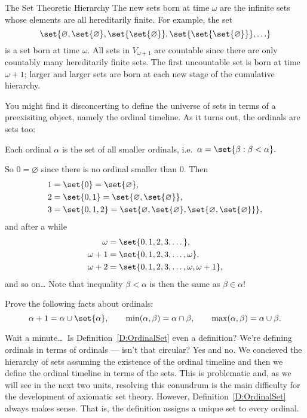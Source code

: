 \begin{unit}{The Set Theoretic Hierarchy}
\noindent
The new sets born at time \(\omega\) are the infinite sets whose elements are all hereditarily finite.
For example, the set \[\set{\varnothing,\set{\varnothing},\set{\set{\varnothing}},\set{\set{\set{\varnothing}}},\ldots}\]
is a set born at time \(\omega.\)
All sets in \(V_{\omega+1}\) are countable since there are only countably many hereditarily finite sets.
The first uncountable set is born at time \(\omega+1\); larger and larger sets are born at each new stage of the cumulative hierarchy.

You might find it disconcerting to define the universe of sets in terms of a preexisiting object, namely the ordinal timeline.
As it turns out, the ordinals are sets too:
 
\begin{definition}\label{D:OrdinalSet}
  Each ordinal \(\alpha\) is the set of all smaller ordinals, i.e.\ \(\alpha = \set{\beta: \beta < \alpha}.\)
\end{definition}
 
\noindent
So \(0 = \varnothing\) since there is no ordinal smaller than \(0.\) 
Then 
\[\begin{aligned}
  1 &= \set{0} = \set{\varnothing}, \\
  2 &= \set{0,1} = \set{\varnothing,\set{\varnothing}}, \\
  3 &= \set{0,1,2} = \set{\varnothing,\set{\varnothing},\set{\varnothing,\set{\varnothing}}}, \\
\end{aligned}\]
and after a while
\[\begin{aligned}
  \omega &= \set{0,1,2,3,\dots}, \\
  \omega+1 &= \set{0,1,2,3,\dots,\omega}, \\
  \omega+2 &= \set{0,1,2,3,\dots,\omega,\omega+1},
\end{aligned}\]
and so on\ldots{}
Note that inequality \(\beta < \alpha\) is then the same as \(\beta \in \alpha\)!

\begin{problem}
  Prove the following facts about ordinals:
 \[\alpha+1 = \alpha\cup\set{\alpha}, \qquad \min(\alpha,\beta) = \alpha \cap \beta, \qquad\max(\alpha,\beta) = \alpha \cup \beta.\]
\end{problem}

Wait a minute\ldots\ Is Definition~\ref{D:OrdinalSet} even a definition?
We're defining ordinals in terms of ordinals --- isn't that circular?
Yes and no.
We concieved the hierarchy of sets assuming the existence of the ordinal timeline and then we define the ordinal timeline in terms of the sets.
This is problematic and, as we will see in the next two units, resolving this conundrum is the main difficulty for the development of axiomatic set theory.
However, Definition~\ref{D:OrdinalSet} always makes sense.
That is, the definition assigns a unique set to every ordinal.


\end{unit}
